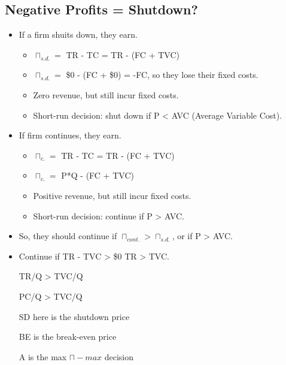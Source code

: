 \documentclass{article}
\begin{document}
\subsection{Negative Profits = Shutdown?}
\begin{itemize}
  \item If a firm shuits down, they earn.
    \begin{itemize}
      \item $\sqcap_{s.d.}^{} = $ TR - TC = TR - (FC + TVC)
      \item $\sqcap_{s.d.}^{} = $ \$0 - (FC + \$0) = -FC, so they lose their fixed costs.
      \item Zero revenue, but still incur fixed costs.
      \item Short-run decision: shut down if P < AVC (Average Variable Cost).
    \end{itemize}
  \item If firm continues, they earn.
    \begin{itemize}
      \item $\sqcap_{c.}^{} = $ TR - TC = TR - (FC + TVC)
      \item $\sqcap_{c.}^{} = $ P*Q - (FC + TVC)
      \item Positive revenue, but still incur fixed costs.
      \item Short-run decision: continue if P > AVC.
    \end{itemize}
  \item So, they should continue if $\sqcap_{cont.} > \sqcap_{s.d.}$, or if P > AVC.
  \item Continue if TR - TVC > \$0 \rightarrow{} TR > TVC.

    TR/Q > TVC/Q

    PC/Q > TVC/Q

    SD here is the shutdown price

    BE is the break-even price

    A is the max $\sqcap-max$ decision
\end{itemize}
\end{document}
